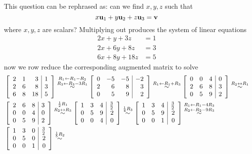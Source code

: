 \begin{solution}
This question can be rephrased as: can we find $x,y,z$ such that
$$x{\bf u}_1+y{\bf u}_2+z{\bf u}_3={\bf v}$$
where $x,y,z$ are scalars? Multiplying out produces the system of linear equations
\begin{align*}
2x+y+3z&=1\\
2x+6y+8z&=3\\
6x+8y+18z&=5
\end{align*}
now we row reduce the corresponding augmented matrix to solve
\begin{align*}
&\leftB \begin{array}{rrr|r} 2 & 1 & 3 & 1 \\ 2 & 6 & 8 & 3\\ 6 & 8 & 18 & 5 \end{array}\rightB  \stackrel{R_1\leftarrow R_1-R_2}{\stackrel{R_3\leftarrow R_3-3R_1}{\sim}}
\leftB \begin{array}{rrr|r} 0 & -5 & -5 & -2 \\ 2 & 6 & 8 & 3 \\ 0 & 5 & 9 & 2 \end{array}\rightB \stackrel{R_1\leftarrow R_1+R_3}{\sim}
\leftB \begin{array}{rrr|r} 0 & 0 & 4 & 0 \\ 2 & 6 & 8 & 3 \\ 0 & 5 & 9 & 2 \end{array}\rightB \stackrel{R_2\leftrightarrow R_1}{\sim} \\
&\leftB \begin{array}{rrr|r} 2 & 6 & 8 & 3 \\ 0 & 0 & 4 & 0 \\ 0 & 5 & 9 & 2 \end{array}\rightB \stackrel{\frac{1}{2}R_1}{\stackrel{R_2\leftrightarrow R_3}{\sim}}
\leftB \begin{array}{rrr|r} 1 & 3 & 4 & \frac{3}{2} \\ 0 & 5 & 9 & 2\\  0 & 0 & 4 & 0\end{array}\rightB \stackrel{\frac{1}{4}R_3}{\sim}
\leftB \begin{array}{rrr|r} 1 & 3 & 4 & \frac{3}{2} \\ 0 & 5 & 9 & 2\\  0 & 0 & 1 & 0 \end{array}\rightB \stackrel{R_1\leftarrow R_1-4R_3}{\stackrel{R_2\leftarrow R_2-9R_3}{\sim}} \\
& \leftB \begin{array}{rrr|r} 1 & 3 & 0 & \frac{3}{2} \\ 0 & 5 & 0 & 2\\  0 & 0 & 1 & 0 \end{array}\rightB  \stackrel{\frac{1}{5}R_2}{\sim}

\end{align*}
\end{solution}
